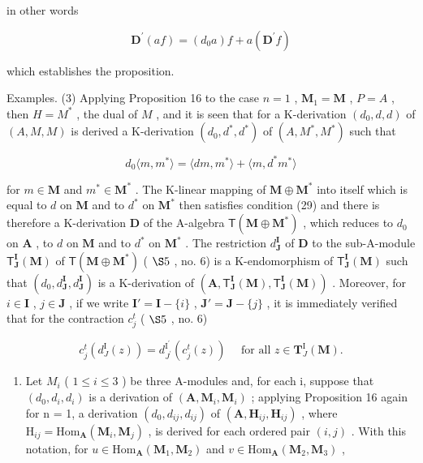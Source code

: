 in other words

\[
\mathbf {D} ^ {\prime} (a f) = \left(d _ {0} a\right) f + a (\mathbf {D} ^ {\prime} f)
\]

which establishes the proposition.

Examples. (3) Applying Proposition 16 to the case \(n = 1\) , \(\mathbf{M}_1 = \mathbf{M}\) , \(P = A\) , then \(H = M^*\) , the dual of \(M\) , and it is seen that for a K-derivation \((d_0, d, d)\) of \((A, M, M)\) is derived a K-derivation \((d_0, d^*, d^*)\) of \((A, M^*, M^*)\) such that

\[
d _ {0} \langle m, m ^ {*} \rangle = \langle d m, m ^ {*} \rangle + \langle m, d ^ {*} m ^ {*} \rangle\tag{38}
\]

for \(m \in \mathbf{M}\) and \(m^* \in \mathbf{M}^*\) . The K-linear mapping of \(\mathbf{M} \oplus \mathbf{M}^*\) into itself which is equal to \(d\) on \(\mathbf{M}\) and to \(d^{*}\) on \(\mathbf{M}^{*}\) then satisfies condition (29) and there is therefore a K-derivation \(\mathbf{D}\) of the A-algebra \(\mathsf{T}(\mathbf{M} \oplus \mathbf{M}^{*})\) , which reduces to \(d_{0}\) on \(\mathbf{A}\) , to \(d\) on \(\mathbf{M}\) and to \(d^{*}\) on \(\mathbf{M}^{*}\) . The restriction \(d_{\mathbf{J}}^{\mathbf{I}}\) of \(\mathbf{D}\) to the sub-A-module \(\mathsf{T}_{\mathbf{J}}^{\mathbf{I}}(\mathbf{M})\) of \(\mathsf{T}(\mathbf{M} \oplus \mathbf{M}^{*})\) ( \(\S 5\) , no. 6) is a K-endomorphism of \(\mathsf{T}_{\mathbf{J}}^{\mathbf{I}}(\mathbf{M})\) such that \((d_{0}, d_{\mathbf{J}}^{\mathbf{I}}, d_{\mathbf{J}}^{\mathbf{I}})\) is a K-derivation of \((\mathbf{A}, \mathsf{T}_{\mathbf{J}}^{\mathbf{I}}(\mathbf{M}), \mathsf{T}_{\mathbf{J}}^{\mathbf{I}}(\mathbf{M}))\) . Moreover, for \(i \in \mathbf{I}\) , \(j \in \mathbf{J}\) , if we write \(\mathbf{I}' = \mathbf{I} - \{i\}\) , \(\mathbf{J}' = \mathbf{J} - \{j\}\) , it is immediately verified that for the contraction \(c_{j}^{t}\) ( \(\S 5\) , no. 6)

\[
c _ {j} ^ {t} (d _ {J} ^ {\mathrm{I}} (z)) = d _ {J ^ {\prime}} ^ {\mathrm{I} ^ {\prime}} (c _ {j} ^ {t} (z)) \quad \text { for   all } z \in \mathbf {T} _ {J} ^ {\mathrm{I}} (\mathbf {M}).
\]

\begin{enumerate}
\def\labelenumi{(\arabic{enumi})}
\setcounter{enumi}{3}
\tightlist
\item
  Let \(M_{i}\) ( \(1 \leqslant i \leqslant 3\) ) be three A-modules and, for each i, suppose that \((d_{0}, d_{i}, d_{i})\) is a derivation of \((\mathbf{A}, \mathbf{M}_{i}, \mathbf{M}_{i})\) ; applying Proposition 16 again for n = 1, a derivation \((d_{0}, d_{ij}, d_{ij})\) of \((\mathbf{A}, \mathbf{H}_{ij}, \mathbf{H}_{ij})\) , where \(\mathrm{H}_{ij} = \mathrm{Hom}_{\mathbf{A}}(\mathbf{M}_{i}, \mathbf{M}_{j})\) , is derived for each ordered pair \((i, j)\) . With this notation, for \(u \in \mathrm{Hom}_{\mathbf{A}}(\mathbf{M}_{1}, \mathbf{M}_{2})\) and \(v \in \mathrm{Hom}_{\mathbf{A}}(\mathbf{M}_{2}, \mathbf{M}_{3})\) ,
\end{enumerate}

